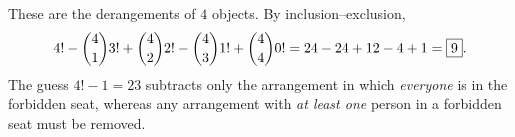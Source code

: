 These are the derangements of $4$ objects. By inclusion--exclusion,
\[4!-\dbinom41 3!+\dbinom42 2!-\dbinom43 1!+\dbinom44 0!=24-24+12-4+1=\boxed{9}.\]
The guess $4!-1=23$ subtracts only the arrangement in which \emph{everyone} is in the forbidden seat, whereas any arrangement with \emph{at least one} person in a forbidden seat must be removed.
